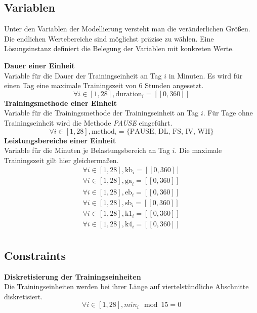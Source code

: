 \subsection{Variablen}
Unter den Variablen der Modellierung versteht man die veränderlichen Größen. Die endlichen Wertebereiche sind möglichst präzise zu wählen. Eine Lösungsinstanz definiert die Belegung der Variablen mit konkreten Werte.

\textbf{Dauer einer Einheit} \\[0.2em]
Variable für die Dauer der Trainingseinheit an Tag $i$ in Minuten. Es wird für einen Tag eine maximale Trainingszeit von 6 Stunden angesetzt.
\begin{equation} 
    \forall i \in [1, 28], \text{duration}_i = [\![0, 360]\!] \end{equation} 
\textbf{Trainingsmethode einer Einheit} \\[0.2em]
Variable für die Trainingsmethode der Trainingseinheit an Tag $i$. Für Tage ohne Trainingseinheit wird die Methode \textit{PAUSE} eingeführt.
\begin{equation} 
    \forall i \in [1, 28], \text{method}_i = \{\text{PAUSE, DL, FS, IV, WH}\}
\end{equation} 
\textbf{Leistungsbereiche einer Einheit} \\[0.2em]
Variable für die Minuten je Belastungsbereich an Tag $i$. Die maximale Trainingszeit gilt hier gleichermaßen.
\begin{equation} 
\begin{array}{c}
    \forall i \in [1, 28], \text{kb}_i = [\![0, 360]\!] \\
    \forall i \in [1, 28], \text{ga}_i = [\![0, 360]\!] \\
    \forall i \in [1, 28], \text{eb}_i = [\![0, 360]\!] \\
    \forall i \in [1, 28], \text{sb}_i = [\![0, 360]\!] \\
    \forall i \in [1, 28], \text{k1}_i = [\![0, 360]\!] \\
    \forall i \in [1, 28], \text{k4}_i = [\![0, 360]\!] \\
\end{array}
\end{equation} 
\subsection{Constraints}
\textbf{Diskretisierung der Trainingseinheiten} \\[0.2em]
Die Trainingseinheiten werden bei ihrer Länge auf viertelstündliche Abschnitte diskretisiert. 
\begin{equation}
    \forall i \in [1, 28], min_i \mod 15 = 0
\end{equation} 

